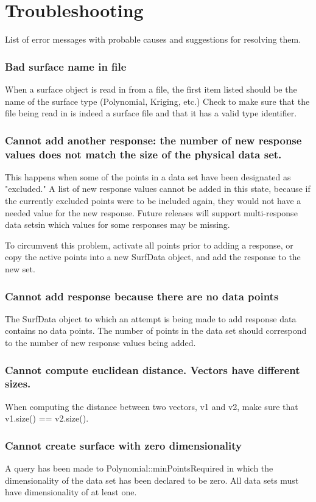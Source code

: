 \documentclass{article}
\begin{document}
\section{Troubleshooting}
List of error messages with probable causes and suggestions for resolving them.

\subsubsection{Bad surface name in file}
When a surface object is read in from a file, the first item listed should be the name of the surface type (Polynomial, Kriging, etc.) Check to make sure that the file being read in is indeed a surface file and that it has a valid type identifier.  

\subsubsection{Cannot add another response: the number of new response values does not match the size of the physical data set.}
This happens when some of the points in a data set have been designated as "excluded."  A list of new response values cannot be added in this state, because if the currently excluded points were to be included again, they would not have a needed value for the new response.  Future releases will support multi-response data setsin which values for some responses may be missing.

To circumvent this problem, activate all points prior to adding a response, or copy the active points into a new SurfData object, and add the response to the new set.


\subsubsection{Cannot add response because there are no data points}
The SurfData object to which an attempt is being made to add response data contains no data points.  The number of points in the data set should correspond to the number of new response values being added.

\subsubsection{Cannot compute euclidean distance. Vectors have different sizes.}
When computing the distance between two vectors, v1 and v2, make sure that v1.size() == v2.size().

\subsubsection{Cannot create surface with zero dimensionality}
A query has been made to Polynomial::minPointsRequired in which the dimensionality of the data set has been declared to be zero.  All data sets must have dimensionality of at least one.
\end{document}
